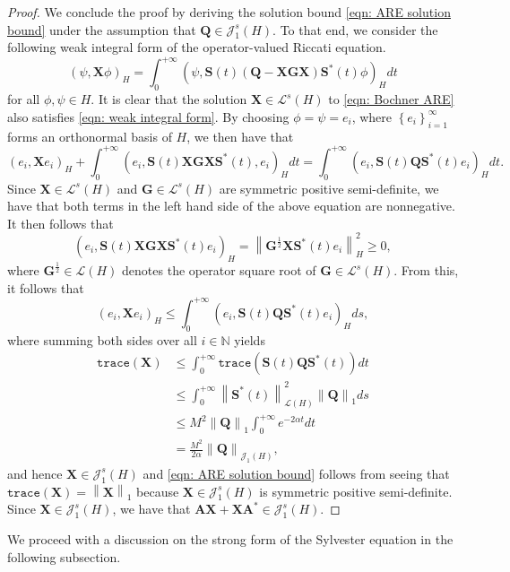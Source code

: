 \documentclass{amsart}
\newcommand{\sL}{\mathscr L}
\newcommand{\sJ}{\mathscr J}
\newcommand{\p}[1]{\left( {#1} \right)}
\newcommand{\norm}[1]{\left\| #1 \right\|}
\newcommand{\Br}[1]{\left\{ #1 \right\}}
\newcommand{\trace}[1]{\texttt{trace}\left( #1\right)}
\newcommand{\bA}{\mathbf A}
\newcommand{\bX}{\mathbf X}
\newcommand{\bQ}{\mathbf Q}
\newcommand{\bG}{\mathbf G}
\newcommand{\bS}{\mathbf S}
\begin{document}
\begin{proof}
We conclude the proof by deriving the solution bound \eqref{eqn: ARE solution bound} under the assumption that $\bQ \in \sJ_1^s(H)$. To that end, we consider the following weak integral form of the operator-valued Riccati equation.
\begin{equation} \label{eqn: weak integral form}
    \p{\psi, \bX\phi}_H = \int_0^{+\infty}  \p{\psi, \bS(t)\p{\bQ - \bX\bG\bX} \bS^*(t)\phi}_H dt 
\end{equation}
for all $\phi,\psi \in H$. It is clear that the solution $\bX \in \sL^s(H) $ to \eqref{eqn: Bochner ARE} also satisfies \eqref{eqn: weak integral form}. By choosing $\phi = \psi = e_i$, where $\Br{e_i}_{i=1}^\infty$ forms an orthonormal basis of $H$, we then have that 
$$
    \p{e_i, \bX e_i}_H + \int_0^{+\infty} \p{e_i, \bS(t)\bX \bG \bX \bS^*(t), e_i}_H dt = \int_0^{+\infty} \p{e_i,\bS(t)\bQ\bS^*(t)e_i}_H dt.
$$
Since $\bX\in \sL^s(H)$ and $\bG\in \sL^s(H)$ are symmetric positive semi-definite, we have that both terms in the left hand side of the above equation are nonnegative. It then follows that
$$
    \p{e_i, \bS(t) \bX\bG\bX \bS^*(t)e_i}_H = \norm{\bG^{\frac12}\bX\bS^*(t) e_i}_H^2 \geq 0,
$$
where $\bG^{\frac12} \in \sL(H)$ denotes the operator square root \cite[Theorem 7.38]{axler2024linear} of $\bG \in \sL^s(H)$. From this, it follows that
$$
    \p{e_i, \bX e_i}_H \leq \int_0^{+\infty} \p{e_i,\bS(t)\bQ\bS^*(t)e_i}_Hds,
$$
where summing both sides over all $i\in\mathbb N$ yields
$$
\begin{aligned}
    \trace{\bX} &\leq \int_0^{+\infty} \trace{\bS(t)\bQ\bS^*(t)}dt \\ 
    &\leq \int_0^{+\infty} \norm{\bS^*(t)}^2_{\sL\p{H}}\norm{\bQ}_{1}ds \\
    &\leq M^2\norm{\bQ}_{1} \int_0^{+\infty}  e^{-2\alpha t} dt \\
    &= \frac{M^2}{2\alpha} \norm{\bQ}_{\sJ_1\p{H}},
\end{aligned}
$$
and hence $\bX \in \sJ_1^s(H)$ and \eqref{eqn: ARE solution bound} follows from seeing that
$\trace{\bX} = \norm{\bX}_{1}$ because $\bX \in \sJ_1^s(H)$ is symmetric positive semi-definite. Since $\bX\in \sJ_1^s(H)$, we have that $\bA\bX+\bX\bA^*\in \sJ_1^s(H)$.  
\end{proof}

We proceed with a discussion on the strong form of the Sylvester equation in the following subsection. 
\end{document}
